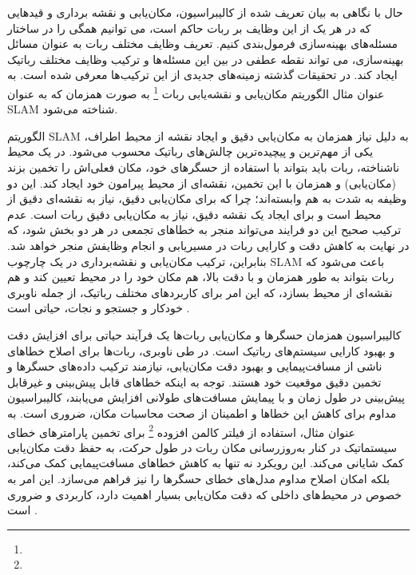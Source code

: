 حال با نگاهی به بیان تعریف شده از کالیبراسیون، مکان‌یابی و نقشه برداری و قید‌هایی که در هر یک از این وظایف بر ربات حاکم است، می توانیم همگی را در ساختار مسئله‌های بهینه‌سازی فرمول‌بندی کنیم. تعریف وظایف مختلف ربات به عنوان مسائل بهینه‌سازی، می تواند نقطه عطفی در بین این مسئله‌ها و ترکیب وظایف مختلف رباتیک ایجاد کند. در تحقیقات گذشته زمینه‌های جدیدی از این ترکیب‌ها معرفی شده است. به عنوان مثال الگوریتم مکان‌یابی و نقشه‌یابی ربات 
\footnote{}
به صورت همزمان که به عنوان SLAM شناخته می‌شود. 

الگوریتم SLAM به دلیل نیاز همزمان به مکان‌یابی دقیق و ایجاد نقشه از محیط اطراف، یکی از مهم‌ترین و پیچیده‌ترین چالش‌های رباتیک محسوب می‌شود. در یک محیط ناشناخته، ربات باید بتواند با استفاده از حسگرهای خود، مکان فعلی‌اش را تخمین بزند (مکان‌یابی) و همزمان با این تخمین، نقشه‌ای از محیط پیرامون خود ایجاد کند. این دو وظیفه به شدت به هم وابسته‌اند؛ چرا که برای مکان‌یابی دقیق، نیاز به نقشه‌ای دقیق از محیط است و برای ایجاد یک نقشه دقیق، نیاز به مکان‌یابی دقیق ربات است. عدم ترکیب صحیح این دو فرایند می‌تواند منجر به خطاهای تجمعی در هر دو بخش شود، که در نهایت به کاهش دقت و کارایی ربات در مسیریابی و انجام وظایفش منجر خواهد شد. بنابراین، ترکیب مکان‌یابی و نقشه‌برداری در یک چارچوب SLAM باعث می‌شود که ربات بتواند به طور همزمان و با دقت بالا، هم مکان خود را در محیط تعیین کند و هم نقشه‌ای از محیط بسازد، که این امر برای کاربردهای مختلف رباتیک، از جمله ناوبری خودکار و جستجو و نجات، حیاتی است
\cite{grisetti2010tutorial}.

کالیبراسیون همزمان حسگرها و مکان‌یابی ربات‌ها یک فرآیند حیاتی برای افزایش دقت و بهبود کارایی سیستم‌های رباتیک است. در طی ناوبری، ربات‌ها برای اصلاح خطاهای ناشی از مسافت‌پیمایی و بهبود دقت مکان‌یابی، نیازمند ترکیب داده‌های حسگرها و تخمین دقیق موقعیت خود هستند.  توجه به اینکه خطاهای قابل پیش‌بینی و غیرقابل پیش‌بینی در طول زمان و با پیمایش مسافت‌های طولانی افزایش می‌یابند، کالیبراسیون مداوم برای کاهش این خطاها و اطمینان از صحت محاسبات مکان، ضروری است.
 به عنوان مثال، استفاده از فیلتر کالمن افزوده 
\footnote{}
برای تخمین پارامترهای خطای سیستماتیک در کنار به‌روزرسانی مکان ربات در طول حرکت، به حفظ دقت مکان‌یابی کمک شایانی می‌کند. این رویکرد نه تنها به کاهش خطاهای مسافت‌پیمایی کمک می‌کند، بلکه امکان اصلاح مداوم مدل‌های خطای حسگرها را نیز فراهم می‌سازد. این امر به خصوص در محیط‌های داخلی که دقت مکان‌یابی بسیار اهمیت دارد، کاربردی و ضروری است
\cite{martinelli2007simultaneous}.

